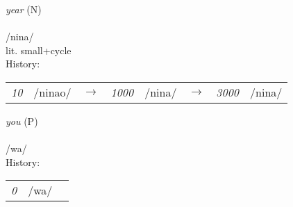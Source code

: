 \vspace{15pt}
\begin{nopagebreak}
 \textit{year} (N)\\
\\
\noindent /n{\textprimstress}ina{}/\\
\noindent lit. small+cycle\\


\noindent History:

\vspace{-0pt}
\hspace{40pt}
\begin{tabular}{ccc}
\textit{10} & /nina{}o{}/&$\rightarrow$ & \textit{1000} & /nina{}{}/&$\rightarrow$ & \textit{3000} & /nina{}/& \\
\end{tabular}

\vspace{20pt}\hline

\end{nopagebreak}
\filbreak



\vspace{15pt}
\begin{nopagebreak}
 \textit{you} (P)\\
\\
\noindent /w{\textprimstress}a/\\


\noindent History:

\vspace{-0pt}
\hspace{40pt}
\begin{tabular}{ccc}
\textit{0} & /wa/& \\
\end{tabular}

\vspace{20pt}\hline

\end{nopagebreak}
\filbreak



